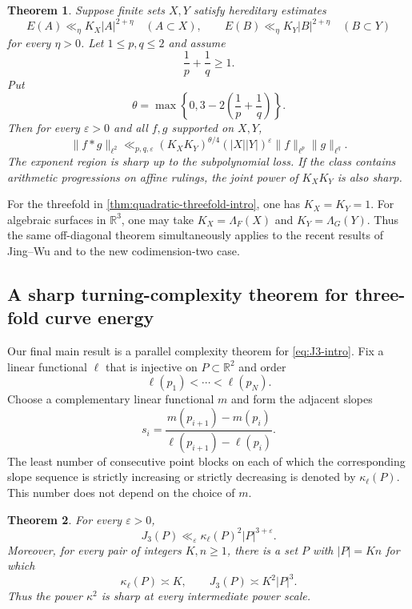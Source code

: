 \documentclass[11pt]{amsart}
\numberwithin{equation}{section}
\newtheorem{theorem}{Theorem}[section]
\theoremstyle{definition}
\theoremstyle{remark}
\newcommand{\R}{\mathbb R}
\newcommand{\eps}{\varepsilon}
\newcommand{\1}{\mathbf 1}
\newcommand{\card}[1]{\lvert #1\rvert}
\newcommand{\norm}[2][]{\lVert #2\rVert_{#1}}
\begin{document}
\begin{theorem}\label{thm:offdiag-alpha2-intro}
Suppose finite sets $X,Y$ satisfy hereditary estimates
\[
 E(A)\ll_\eta K_X\card A^{2+\eta}
 \quad(A\subset X),
 \qquad
 E(B)\ll_\eta K_Y\card B^{2+\eta}
 \quad(B\subset Y)
\]
for every $\eta>0$.  Let $1\leq p,q\leq2$ and assume
\[
 \frac1p+\frac1q\geq1.
\]
Put
\[
 \theta=\max\left\{0,3-2\left(\frac1p+\frac1q\right)\right\}.
\]
Then for every $\eps>0$ and all $f,g$ supported on $X,Y$,
\begin{equation}\label{eq:offdiag-alpha2-intro}
 \norm[\ell^2]{f*g}
 \ll_{p,q,\eps}
 (K_XK_Y)^{\theta/4}(\card X\card Y)^\eps
 \norm[\ell^p]{f}\norm[\ell^q]{g}.
\end{equation}
The exponent region is sharp up to the subpolynomial loss.  If the class contains arithmetic progressions on affine rulings, the joint power of $K_XK_Y$ is also sharp.
\end{theorem}

For the threefold in \cref{thm:quadratic-threefold-intro}, one has $K_X=K_Y=1$.  For algebraic surfaces in $\R^3$, one may take $K_X=\Lambda_F(X)$ and $K_Y=\Lambda_G(Y)$.  Thus the same off-diagonal theorem simultaneously applies to the recent results of Jing--Wu and to the new codimension-two case.

\subsection{A sharp turning-complexity theorem for three-fold curve energy}
Our final main result is a parallel complexity theorem for \eqref{eq:J3-intro}.  Fix a linear functional $\ell$ that is injective on $P\subset\R^2$ and order
\[
 \ell(p_1)<\cdots<\ell(p_N).
\]
Choose a complementary linear functional $m$ and form the adjacent slopes
\[
 s_i=\frac{m(p_{i+1})-m(p_i)}{\ell(p_{i+1})-\ell(p_i)}.
\]
The least number of consecutive point blocks on each of which the corresponding slope sequence is strictly increasing or strictly decreasing is denoted by $\kappa_\ell(P)$.  This number does not depend on the choice of $m$.

\begin{theorem}\label{thm:turning-intro}
For every $\eps>0$,
\begin{equation}\label{eq:turning-intro}
 J_3(P)\ll_\eps \kappa_\ell(P)^2\card P^{3+\eps}.
\end{equation}
Moreover, for every pair of integers $K,n\geq1$, there is a set $P$ with $\card P=Kn$ for which
\[
 \kappa_\ell(P)\asymp K,
 \qquad
 J_3(P)\asymp K^2\card P^3.
\]
Thus the power $\kappa^2$ is sharp at every intermediate power scale.
\end{theorem}
\end{document}
